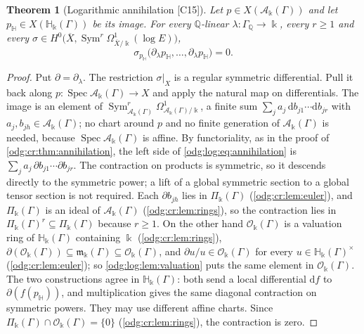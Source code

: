 \documentclass[11pt,oneside]{article}
\numberwithin{equation}{section}
\newtheorem{theorem}{Theorem}[section]
\theoremstyle{definition}
\theoremstyle{remark}
\newcommand{\Q}{\mathbb Q}
\newcommand{\src}[1]{\textup{\textsf{\small[#1]}}}
\newcommand{\crH}{\mathbb H_\Bbbk(\Gamma)}
\newcommand{\crA}{\mathcal A_\Bbbk(\Gamma)}
\newcommand{\crP}{\Pi_\Bbbk(\Gamma)}
\newcommand{\crO}{\mathcal O_\Bbbk(\Gamma)}
\newcommand{\crm}{\mathfrak m_\Bbbk(\Gamma)}
\newcommand{\Spec}{\operatorname{Spec}}
\newcommand{\Sym}{\operatorname{Sym}}
\newcommand{\dif}{\mathrm d}
\begin{document}
\begin{theorem}[Logarithmic annihilation \src{C15}]\label{odg:log:thm:annihilation}
Let $p\in X(\crA)$ and let $p_{\mathbb H}\in X(\crH)$ be its image. For every $\Q$-linear
$\lambda:\Gamma_\Q\to\Bbbk$, every $r\ge1$ and every
$\sigma\in H^0\bigl(\overline X,\Sym^r\Omega^1_{\overline X/\Bbbk}(\log E)\bigr)$,
\begin{equation}\label{odg:log:eq:annihilation}
 \sigma_{p_{\mathbb H}}\bigl(\partial_\lambda p_{\mathbb H},\ldots,\partial_\lambda p_{\mathbb H}\bigr)=0 .
\end{equation}
\end{theorem}
\begin{proof}
Put $\partial=\partial_\lambda$. The restriction $\sigma|_X$ is a regular symmetric
differential. Pull it back along $p:\Spec\crA\to X$ and apply the natural
map on differentials. The image is an element of
$\Sym^r_{\crA}\Omega^1_{\crA/\Bbbk}$, a finite sum
$\sum_ja_j\,\dif b_{j1}\cdots\dif b_{jr}$ with $a_j,b_{jh}\in\crA$; no chart around $p$
and no finite generation of $\crA$ is needed, because $\Spec\crA$ is affine. By
functoriality, as in the proof of \cref{odg:cr:thm:annihilation}, the left side of
\eqref{odg:log:eq:annihilation} is $\sum_ja_j\,\partial b_{j1}\cdots\partial b_{jr}$.
The contraction on products is symmetric, so it descends directly to the
symmetric power; a lift of a global symmetric section to a global tensor
section is not required. Each $\partial b_{jh}$ lies in $\crP$
(\cref{odg:cr:lem:euler}), and $\crP$ is an ideal of $\crA$
(\cref{odg:cr:lem:rings}), so the contraction lies in
$\crP^r\subseteq\crP$ because $r\ge1$. On the other hand
$\crO$ is a valuation ring of $\crH$ containing $\Bbbk$ (\cref{odg:cr:lem:rings}),
$\partial(\crO)\subseteq\crm\subseteq\crO$, and $\partial u/u\in\crO$ for every
$u\in\crH^\times$ (\cref{odg:cr:lem:euler}); so \cref{odg:log:lem:valuation} puts the
same element in $\crO$. The two constructions agree in $\crH$:
both send a local differential $\dif f$ to
$\partial(f(p_{\mathbb H}))$, and multiplication gives the same diagonal
contraction on symmetric powers. They may use different affine charts.
Since $\crP\cap\crO=\{0\}$ (\cref{odg:cr:lem:rings}), the contraction is zero.
\end{proof}
\end{document}
